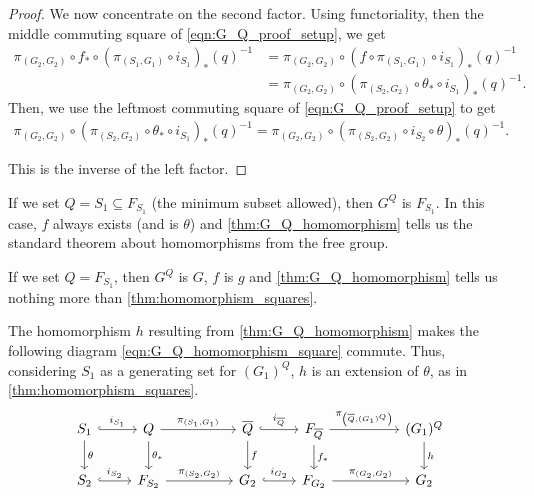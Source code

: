 \begin{proof}
	We now concentrate on the second factor.
	Using functoriality, then the middle commuting square of \eqref{eqn:G_Q_proof_setup}, we get
	\begin{align*}
		\pi_{(G_2,G_2)} \circ f_* \circ\left( \pi_{(S_1,G_1)} \circ i_{S_1}\right)_*(q)^{-1} & = \pi_{(G_2,G_2)} \circ \left( f \circ \pi_{(S_1,G_1)} \circ i_{S_1}\right)_*(q)^{-1}
		\\ &= \pi_{(G_2,G_2)} \circ \left(\pi_{(S_2,G_2)} \circ \theta_* \circ i_{S_1}\right)_*(q)^{-1}.
	\end{align*}
	Then, we use the leftmost commuting square of \eqref{eqn:G_Q_proof_setup} to get
	\begin{align*}
		\pi_{(G_2,G_2)} \circ \left(\pi_{(S_2,G_2)} \circ \theta_* \circ i_{S_1}\right)_*(q)^{-1} = \pi_{(G_2,G_2)} \circ \left(\pi_{(S_2,G_2)} \circ i_{S_2} \circ \theta \right)_*(q)^{-1}.
	\end{align*}

	This is the inverse of the left factor.
\end{proof}

\begin{remark}
	If we set $Q = S_1 \subseteq F_{S_1}$ (the minimum subset allowed), then  $G^Q$ is  $F_{S_1}$.
	In this case, $f$ always exists (and is  $\theta$) and \cref{thm:G_Q_homomorphism} tells us the standard theorem about homomorphisms from the free group.
\end{remark}

\begin{remark}
	If we set $Q = F_{S_1}$, then $G^Q$ is  $G$, $f$ is $g$ and \cref{thm:G_Q_homomorphism} tells us nothing more than  \cref{thm:homomorphism_squares}.
\end{remark}

\begin{corollary}
	The homomorphism $h$ resulting from \cref{thm:G_Q_homomorphism} makes the following diagram \eqref{eqn:G_Q_homomorphism_square} commute.
	Thus, considering $S_1$ as a generating set for  $(G_1)^Q$, $h$ is an extension of $\theta$, as in \cref{thm:homomorphism_squares}.
	\begin{equation}
		\begin{tikzcd}
			S_1 \ar[d, "\theta"] \ar[r, hook, "i_{S_1}"] & Q \ar[d, "\theta_*"] \ar[rr, "\pi_{(S_1, G_1)}"] & & \overline{Q} \ar[d, "f"] \ar[r, hook, "i_{\overline{Q}}"] & F_{\overline{Q}} \ar[d, "f_*"] \ar[rr, "\pi_{\left(\overline{Q}, (G_1)^Q\right)}"] & & (G_1)^Q \ar[d, "h"]
			\\ S_2 \ar[r, hook, "i_{S_2}"] & F_{S_2} \ar[rr, "\pi_{(S_2, G_2)}"] & & G_2 \ar[r, hook, "i_{G_2}"] & F_{G_2} \ar[rr, "\pi_{(G_2, G_2)}"] & & G_2
		\end{tikzcd}
		\label{eqn:G_Q_homomorphism_square}
	\end{equation}
\end{corollary}

